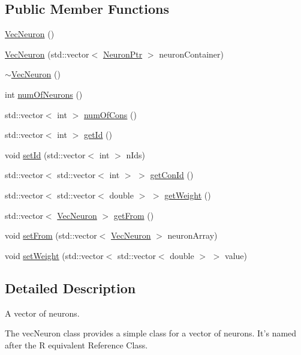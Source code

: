 \subsection*{Public Member Functions}
\begin{DoxyCompactItemize}
\item 
\hyperlink{class_vec_neuron_ae0bbf203eaef81c45facbee57b463b37}{VecNeuron} ()
\item 
\hyperlink{class_vec_neuron_ae7bc02590cd22902220fbcd7949be0e7}{VecNeuron} (std::vector$<$ \hyperlink{_a_m_o_r_e_8h_ac1ea936c2c7728eb382278131652fef4}{NeuronPtr} $>$ neuronContainer)
\item 
\hyperlink{class_vec_neuron_a6bf0db759d6940f4e69e0da4a4c4ea98}{$\sim$VecNeuron} ()
\item 
int \hyperlink{class_vec_neuron_a3bade484bdea1bec20aa6bb0b977d259}{numOfNeurons} ()
\item 
std::vector$<$ int $>$ \hyperlink{class_vec_neuron_a70b0a6f571c1737a6a1d1f6c831fa585}{numOfCons} ()
\item 
std::vector$<$ int $>$ \hyperlink{class_vec_neuron_ab9cf35c1f6b087e0cabfe5294186397c}{getId} ()
\item 
void \hyperlink{class_vec_neuron_a552e694e9ec6a2bc6afc3dfa37ed1a46}{setId} (std::vector$<$ int $>$ nIds)
\item 
std::vector$<$ std::vector$<$ int $>$ $>$ \hyperlink{class_vec_neuron_a90a0279a43adde8619add1fc24f2be0d}{getConId} ()
\item 
std::vector$<$ std::vector$<$ double $>$ $>$ \hyperlink{class_vec_neuron_a7d8e5973473abd6395e6651d6a3cd72e}{getWeight} ()
\item 
std::vector$<$ \hyperlink{class_vec_neuron}{VecNeuron} $>$ \hyperlink{class_vec_neuron_a03fd78d7a064de1ce6509d19cd9d5b58}{getFrom} ()
\item 
void \hyperlink{class_vec_neuron_ab1b2fe596ccf959fa86dfd84844aa81a}{setFrom} (std::vector$<$ \hyperlink{class_vec_neuron}{VecNeuron} $>$ neuronArray)
\item 
void \hyperlink{class_vec_neuron_ad8a9e6c5a28170c1278a8612bfac706a}{setWeight} (std::vector$<$ std::vector$<$ double $>$ $>$ value)
\end{DoxyCompactItemize}


\subsection{Detailed Description}
A vector of neurons. 

The vecNeuron class provides a simple class for a vector of neurons. It's named after the R equivalent Reference Class. 

